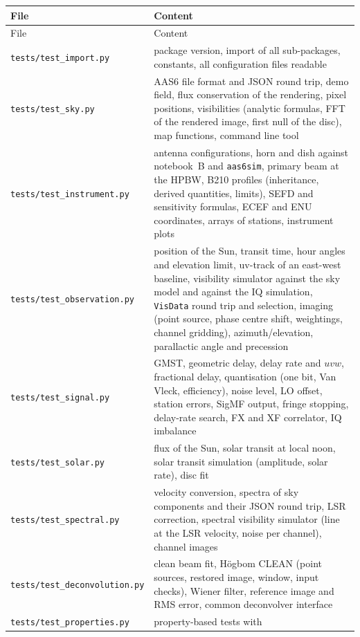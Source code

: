 \begin{longtable}{@{}l>{\raggedright\arraybackslash}p{8.4cm}@{}}
\toprule
File & Content \\
\midrule
\endfirsthead
\toprule
File & Content \\
\midrule
\endhead
\bottomrule
\endlastfoot
\texttt{tests/test\_import.py} & package version, import of all
  sub-packages, constants, all configuration files readable \\
\texttt{tests/test\_sky.py} & AAS6 file format and JSON round trip,
  demo field, flux conservation of the rendering, pixel positions,
  visibilities (analytic formulas, FFT of the rendered image, first null
  of the disc), map functions, command line tool \\
\texttt{tests/test\_instrument.py} & antenna configurations, horn and
  dish against notebook~B and \texttt{aas6sim}, primary beam at the
  HPBW, B210 profiles (inheritance, derived quantities, limits), SEFD and
  sensitivity formulas, ECEF and ENU coordinates, arrays of stations,
  instrument plots \\
\texttt{tests/test\_observation.py} & position of the Sun, transit
  time, hour angles and elevation limit, uv-track of an east-west
  baseline, visibility simulator against the sky model and against the IQ
  simulation, \texttt{VisData} round trip and selection, imaging
  (point source, phase centre shift, weightings, channel gridding),
  azimuth/elevation, parallactic angle and precession \\
\texttt{tests/test\_signal.py} & GMST, geometric delay, delay rate and
  $uvw$, fractional delay, quantisation (one bit, Van Vleck,
  efficiency), noise level, LO offset, station errors, SigMF output,
  fringe stopping, delay-rate search, FX and XF correlator, IQ imbalance \\
\texttt{tests/test\_solar.py} & flux of the Sun, solar transit at local
  noon, solar transit simulation (amplitude, solar rate), disc fit \\
\texttt{tests/test\_spectral.py} & velocity conversion, spectra of sky
  components and their JSON round trip, LSR correction, spectral
  visibility simulator (line at the LSR velocity, noise per channel),
  channel images \\
\texttt{tests/test\_deconvolution.py} & clean beam fit, H\"ogbom CLEAN
  (point sources, restored image, window, input checks), Wiener filter,
  reference image and RMS error, common deconvolver interface \\
\texttt{tests/test\_properties.py} & property-based tests with

\end{longtable}
